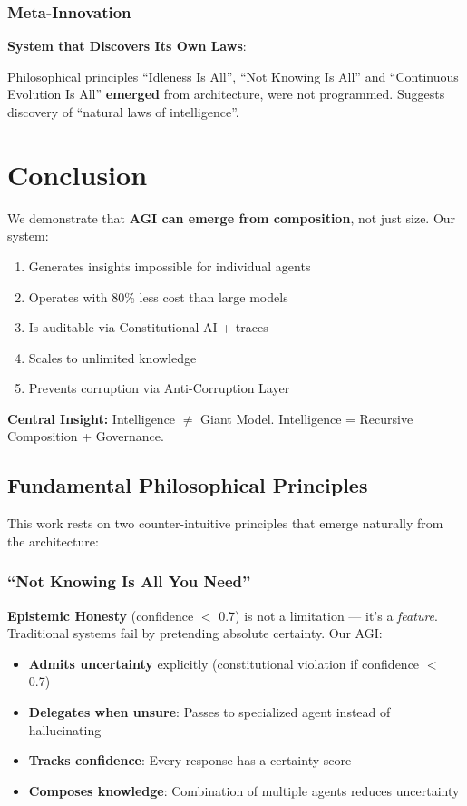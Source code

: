 \documentclass[11pt]{article}
\begin{document}
\subsubsection{Meta-Innovation}

\textbf{System that Discovers Its Own Laws}:

Philosophical principles ``Idleness Is All'', ``Not Knowing Is All'' and ``Continuous Evolution Is All'' \textbf{emerged} from architecture, were not programmed. Suggests discovery of ``natural laws of intelligence''.

\section{Conclusion}

We demonstrate that \textbf{AGI can emerge from composition}, not just size. Our system:

\begin{enumerate}
    \item Generates insights impossible for individual agents
    \item Operates with 80\% less cost than large models
    \item Is auditable via Constitutional AI + traces
    \item Scales to unlimited knowledge
    \item Prevents corruption via Anti-Corruption Layer
\end{enumerate}

\textbf{Central Insight:} Intelligence $\neq$ Giant Model. Intelligence = Recursive Composition + Governance.

\subsection{Fundamental Philosophical Principles}

This work rests on two counter-intuitive principles that emerge naturally from the architecture:

\subsubsection{``Not Knowing Is All You Need''}

\textbf{Epistemic Honesty} (confidence $<$ 0.7) is not a limitation --- it's a \textit{feature}. Traditional systems fail by pretending absolute certainty. Our AGI:

\begin{itemize}
    \item \textbf{Admits uncertainty} explicitly (constitutional violation if confidence $<$ 0.7)
    \item \textbf{Delegates when unsure}: Passes to specialized agent instead of hallucinating
    \item \textbf{Tracks confidence}: Every response has a certainty score
    \item \textbf{Composes knowledge}: Combination of multiple agents reduces uncertainty
\end{itemize}
\end{document}
